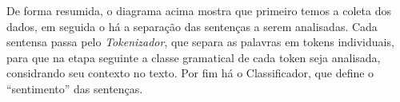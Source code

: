 De forma resumida, o diagrama acima mostra que primeiro temos a coleta dos dados, em seguida o há a separação das sentenças a serem analisadas. Cada sentensa passa pelo \textit{Tokenizador}, que separa as palavras em tokens individuais, para que na etapa seguinte a classe gramatical de cada token seja analisada, considrando seu contexto no texto. Por fim há o Classificador, que define o ``sentimento'' das sentenças.
